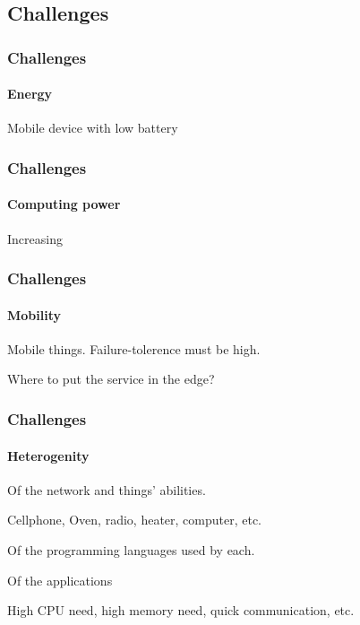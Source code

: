 \documentclass[utf8,xcolor=table, page number]{earlywinter}
\begin{document}
\subsection{Challenges}


\begin{frame}
  \frametitle{Challenges}
  \framesubtitle{Energy}
  
  Mobile device with low battery
  
\end{frame}
\begin{frame}
  \frametitle{Challenges}
  \framesubtitle{Computing power}
  
  Increasing
  
\end{frame}
\begin{frame}
  \frametitle{Challenges}
  \framesubtitle{Mobility}
  
  Mobile things. Failure-tolerence must be high.
  
  Where to put the service in the edge?
  
\end{frame}
\begin{frame}
  \frametitle{Challenges}
  \framesubtitle{Heterogenity}
  
  Of the network and things' abilities.
  
	\begin{example}
		Cellphone, Oven, radio, heater, computer, etc.
	\end{example}
  
  Of the programming languages used by each.  
  
  Of the applications
	\begin{example}
		High CPU need, high memory need, quick communication, etc.
	\end{example}
  
\end{frame}
\end{document}
